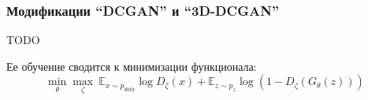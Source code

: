 		\subsubsection{Модификации ``DCGAN'' и ``3D-DCGAN''}
			TODO
			
			\begin{figure}[h!]
			\end{figure}
		
			Ее обучение сводится к минимизации функционала:
			\[ \underset{\theta}{\min} \underset{\zeta}{\max} \ \mathbb{E}_{x \sim p_{data}}\log D_\zeta(x) + \mathbb{E}_{z \sim p_{z}} \log (1 - D_\zeta(G_\theta(z))) \]
